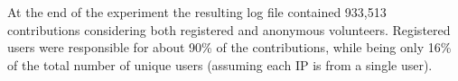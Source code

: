 \documentclass{llncs}
\begin{document}
%
At the end of the experiment the resulting log file
contained 933,513 contributions considering both
registered and anonymous volunteers. Registered users were responsible for about
90\% of the contributions, while being only 16\% of the total number of unique users (assuming each IP is from a single user).
\end{document}
